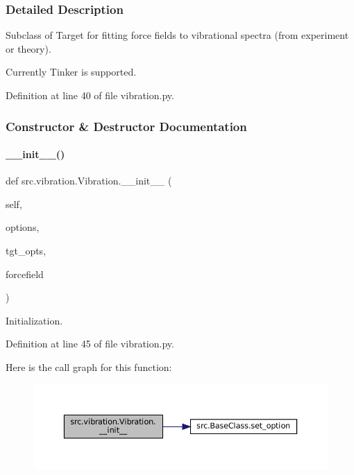 \subsubsection{Detailed Description}
Subclass of Target for fitting force fields to vibrational spectra (from experiment or theory). 

Currently Tinker is supported. 

Definition at line 40 of file vibration.\+py.



\subsubsection{Constructor \& Destructor Documentation}
\mbox{\label{classsrc_1_1vibration_1_1Vibration_adada8dc93aaa34ec4b07f017808ec7d5}} 
\paragraph{\texorpdfstring{\+\_\+\+\_\+init\+\_\+\+\_\+()}{\_\_init\_\_()}}
{\footnotesize\ttfamily def src.\+vibration.\+Vibration.\+\_\+\+\_\+init\+\_\+\+\_\+ (\begin{DoxyParamCaption}\item[{}]{self,  }\item[{}]{options,  }\item[{}]{tgt\+\_\+opts,  }\item[{}]{forcefield }\end{DoxyParamCaption})}



Initialization. 



Definition at line 45 of file vibration.\+py.

Here is the call graph for this function\+:
\nopagebreak
\begin{figure}[H]
\begin{center}
\leavevmode
\includegraphics[width=350pt]{classsrc_1_1vibration_1_1Vibration_adada8dc93aaa34ec4b07f017808ec7d5_cgraph}
\end{center}
\end{figure}



